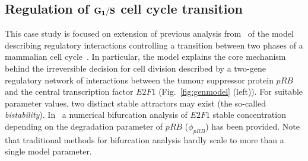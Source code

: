 \documentclass{llncs}
\begin{document}

\enlargethispage*{4mm}
\subsection{Regulation of $\bf G_1 / S$ cell cycle transition}

This case study is focused on extension of previous analysis from~\cite{CMSB15} of the model describing regulatory interactions controlling a transition between two phases of a mammalian cell cycle~\cite{SKH04}. In particular, the model explains the core mechanism behind the irreversible decision for cell division described by a two-gene regulatory network of interactions between the tumour suppressor protein $pRB$ and the central transcription factor $E2F1$ (Fig.~\ref{fig:genmodel} (left)). For suitable parameter values, two distinct stable attractors may exist (the so-called \emph{bistability}). In~\cite{SKH04} a numerical bifurcation analysis of $E2F1$ stable concentration depending on the degradation parameter of $pRB$ ($\phi_{pRB}$) has been provided. Note that traditional methods for bifurcation analysis hardly scale to more than a single model parameter.
\end{document}
